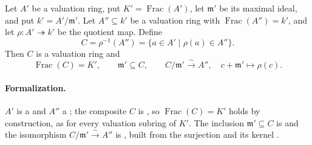 \begin{lemma}
  \label{lemma:nagata-composite-valuation-ring}
  \leanok

  Let $A'$ be a valuation ring, put
  $K'=\operatorname{Frac}(A')$, let $\mathfrak m'$ be its maximal ideal, and
  put $k'=A'/\mathfrak m'$.  Let $A''\subseteq k'$ be a valuation ring with
  $\operatorname{Frac}(A'')=k'$, and let
  $\rho\colon A'\twoheadrightarrow k'$ be the quotient map.  Define
  \[
    C=\rho^{-1}(A'')=\{a\in A'\mid\rho(a)\in A''\}.
  \]
  Then $C$ is a valuation ring and
  \[
    \operatorname{Frac}(C)=K',
    \qquad
    \mathfrak m'\subseteq C,
    \qquad
    C/\mathfrak m'\xrightarrow{\sim}A'',\quad
    c+\mathfrak m'\longmapsto\rho(c).
  \]

  \paragraph{Formalization.}
  $A'$ is a \texttt{} and $A''$ a
  \texttt{}; the composite $C$
  is \texttt{}, so
  $\operatorname{Frac}(C)=K'$ holds by construction, as for every valuation subring of
  $K'$.  The inclusion $\mathfrak m'\subseteq C$ is
  \texttt{} and the
  isomorphism $C/\mathfrak m'\xrightarrow{\sim}A''$ is
  \texttt{}, built from the surjection
  \texttt{} and its kernel
  \texttt{}.
\end{lemma}

